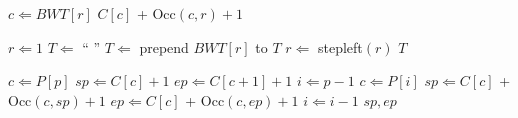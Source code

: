 \documentclass{article}
\begin{document}
\newcommand{\stepleft}{\ensuremath{\mbox{\sc stepleft}}}
\newcommand{\unpermute}{\ensuremath{\mbox{\sc unpermute}}}
\newcommand{\exactmatch}{\ensuremath{\mbox{\sc exactmatch}}}

\begin{algorithm}[stepleft]
\caption{$\stepleft(r)$}\label{alg:stepleft} 
\begin{algorithmic}[1] 
\STATE $c \Leftarrow BWT[r]$
\RETURN $C[c] $ + Occ$(c, r) + 1$
\end{algorithmic} 
\end{algorithm} 

\begin{algorithm}[unpermute]
\caption{$\unpermute$}\label{alg:unpermute} 
\begin{algorithmic}[1] 
\STATE $r \Leftarrow 1$
\STATE $T \Leftarrow $ `` ''
\STATE $T \Leftarrow $ prepend $BWT[r]$ to $T$
\STATE $r \Leftarrow $ {\sc stepleft}$(r)$
\ENDWHILE
\RETURN $T$
\end{algorithmic} 
\end{algorithm} 

\begin{algorithm}[exactmatch]
\caption{$\exactmatch(P[1,p])$}\label{alg:exactmatch} 
\begin{algorithmic}[1] 
\STATE $c \Leftarrow P[p]$
\STATE $sp \Leftarrow C[c]+1$
\STATE $ep \Leftarrow C[c+1]+1$
\STATE $i \Leftarrow p - 1$
\STATE $c \Leftarrow P[i]$
\STATE $sp \Leftarrow C[c]$ + Occ$(c, sp) + 1$
\STATE $ep \Leftarrow C[c]$ + Occ$(c, ep) + 1$
\STATE $i \Leftarrow i-1$
\ENDWHILE
\RETURN $sp, ep$
\end{algorithmic} 
\end{algorithm} 
\end{document}
